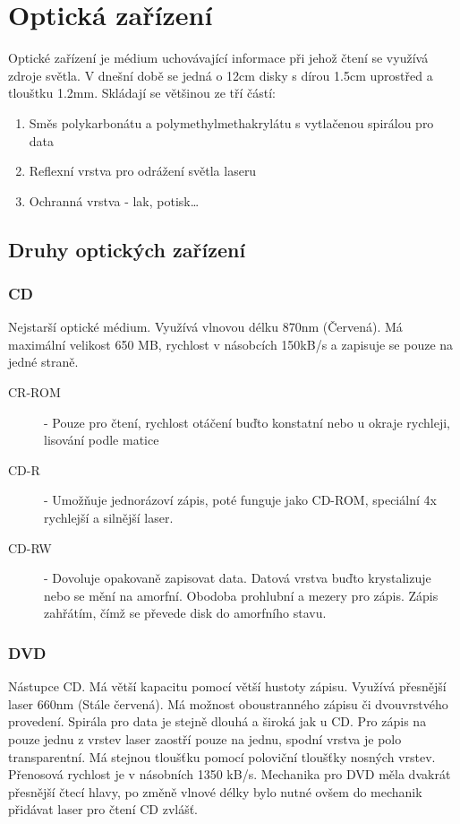 \section{Optická zařízení}
\label{sec:opticka-zarizeni}
Optické zařízení je médium uchovávající informace při jehož čtení se využívá zdroje světla.
V dnešní době se jedná o 12cm disky s dírou 1.5cm uprostřed a tlouštku 1.2mm.
Skládají se většinou ze tří částí:\\
\begin{enumerate}
  \item Směs polykarbonátu a polymethylmethakrylátu s vytlačenou spirálou pro data
  \item Reflexní vrstva pro odrážení světla laseru
  \item Ochranná vrstva - lak, potisk\dots
\end{enumerate}
\subsection{Druhy optických zařízení}
\subsubsection{CD}
Nejstarší optické médium.
Využívá vlnovou délku 870nm (Červená).
Má maximální velikost 650 MB, rychlost v násobcích 150kB/s a zapisuje se pouze na jedné straně.\\
\begin{description}
  \item[CR-ROM]- Pouze pro čtení, rychlost otáčení buďto konstatní nebo u okraje rychleji, lisování podle matice
  \item[CD-R]- Umožňuje jednorázoví zápis, poté funguje jako CD-ROM, speciální 4x rychlejší a silnější laser.
  \item[CD-RW]- Dovoluje opakovaně zapisovat data. Datová vrstva buďto krystalizuje nebo se mění na amorfní.
  Obodoba prohlubní a mezery pro zápis. Zápis zahřátím, čímž se převede disk do amorfního stavu.
\end{description}
\subsubsection{DVD}
Nástupce CD. Má větší kapacitu pomocí větší hustoty zápisu.
Využívá přesnější laser 660nm (Stále červená).
Má možnost oboustranného zápisu či dvouvrstvého provedení.
Spirála pro data je stejně dlouhá a široká jak u CD.
Pro zápis na pouze jednu z vrstev laser zaostří pouze na jednu, spodní vrstva je polo transparentní.
Má stejnou tloušťku pomocí poloviční tloušťky nosných vrstev.
Přenosová rychlost je v násobních 1350 kB/s.
Mechanika pro DVD měla dvakrát přesnější čtecí hlavy, po změně vlnové délky bylo nutné ovšem do mechanik přidávat laser pro čtení CD zvlášť.
